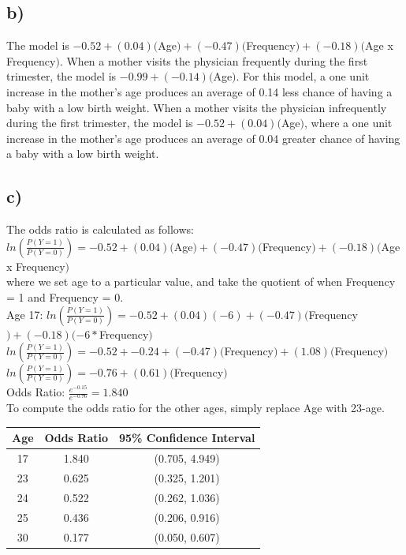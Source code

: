 \documentclass[12pt, letterpaper]{article}
\begin{document}
\subsection*{b)} The model is $-0.52+(0.04)($Age$)+(-0.47)($Frequency$)+(-0.18)($Age x Frequency$)$. When a mother visits the physician frequently during the first trimester, the model is $-0.99 + (-0.14)($Age$)$. For this model, a one unit increase in the mother's age produces an average of 0.14 less chance of having a baby with a low birth weight. When a mother visits the physician infrequently during the first trimester, the model is $-0.52 + (0.04)($Age$)$, where a one unit increase in the mother's age produces an average of 0.04 greater chance of having a baby with a low birth weight.

\subsection*{c)} The odds ratio is calculated as follows: \\
$ln(\frac{P(Y=1)}{P(Y=0)}) = -0.52 + (0.04)($Age$) + (-0.47)($Frequency$) + (-0.18)($Age x Frequency$)$\\
where we set age to a particular value, and take the quotient of when Frequency = 1 and Frequency = 0.\\
Age 17: $ln(\frac{P(Y=1)}{P(Y=0)}) = -0.52 + (0.04)(-6) + (-0.47)($Frequency$) + (-0.18)(-6 * $Frequency$)$\\
$ln(\frac{P(Y=1)}{P(Y=0)}) = -0.52 + -0.24 + (-0.47)($Frequency$) + (1.08)($Frequency$)$\\
$ln(\frac{P(Y=1)}{P(Y=0)}) = -0.76 + (0.61)($Frequency$)$\\
Odds Ratio: $\frac{e^{-0.15}}{e^{-0.76}} = 1.840$\\
To compute the odds ratio for the other ages, simply replace Age with 23-age.\\
 \begin{tabular}{ |c|c|c| } 
 \hline
 \textbf{Age} & \textbf{Odds Ratio} & \textbf{95\% Confidence Interval} \\ 
\hline
 17 & 1.840 & (0.705, 4.949) \\ 
\hline
 23 & 0.625 & (0.325, 1.201) \\ 
 \hline
 24 & 0.522 & (0.262, 1.036) \\ 
 \hline
 25 & 0.436 & (0.206, 0.916) \\ 
 \hline
 30 & 0.177 & (0.050, 0.607) \\ 
 \hline
\end{tabular}
\end{document}
